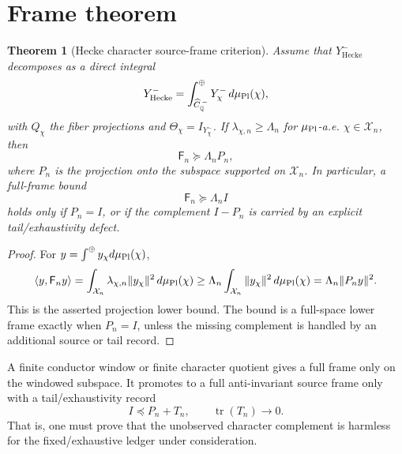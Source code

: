 \documentclass[11pt]{article}
\newtheorem{theorem}{Theorem}
\DeclareMathOperator{\tr}{tr}
\newcommand{\F}{\mathsf F}
\newcommand{\Hecke}{\mathrm{Hecke}}
\begin{document}
\section{Frame theorem}
\begin{theorem}[Hecke character source-frame criterion]
Assume that \(Y^-_{\Hecke}\) decomposes as a direct integral
\begin{equation}
  Y^-_{\Hecke}=\int_{\widehat C_{\mathbb Q}^{\,-}}^{\oplus}Y^-_\chi\,d\mu_{\rm Pl}(\chi),
\end{equation}
with \(Q_\chi\) the fiber projections and \(\Theta_\chi=I_{Y^-_\chi}\).  If \(\lambda_{\chi,n}\ge \Lambda_n\) for \(\mu_{\rm Pl}\)-a.e. \(\chi\in\mathcal X_n\), then
\begin{equation}
  \F_n\succeq \Lambda_n P_n,
\end{equation}
where \(P_n\) is the projection onto the subspace supported on \(\mathcal X_n\).  In particular, a full-frame bound
\begin{equation}
  \F_n\succeq \Lambda_n I
\end{equation}
holds only if \(P_n=I\), or if the complement \(I-P_n\) is carried by an explicit tail/exhaustivity defect.
\end{theorem}

\begin{proof}
For \(y=\int^\oplus y_\chi d\mu_{\rm Pl}(\chi)\),
\begin{equation}
  \langle y,\F_ny\rangle
  =\int_{\mathcal X_n}\lambda_{\chi,n}\|y_\chi\|^2\,d\mu_{\rm Pl}(\chi)
  \ge \Lambda_n\int_{\mathcal X_n}\|y_\chi\|^2\,d\mu_{\rm Pl}(\chi)
  =\Lambda_n\|P_ny\|^2.
\end{equation}
This is the asserted projection lower bound.  The bound is a full-space lower frame exactly when \(P_n=I\), unless the missing complement is handled by an additional source or tail record.
\end{proof}

\begin{corollary}
A finite conductor window or finite character quotient gives a full frame only on the windowed subspace.  It promotes to a full anti-invariant source frame only with a tail/exhaustivity record
\begin{equation}
  I\preceq P_n+T_n,
  \qquad \tr(T_n)\to0.
\end{equation}
That is, one must prove that the unobserved character complement is harmless for the fixed/exhaustive ledger under consideration.
\end{corollary}
\end{document}
